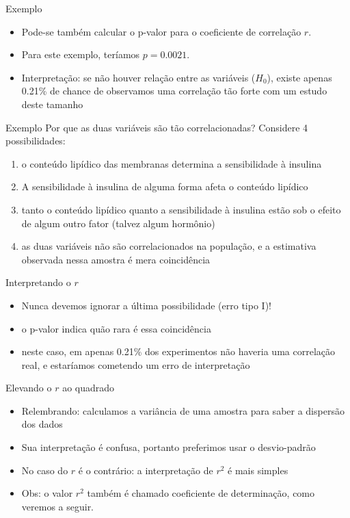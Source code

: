 \documentclass{beamer}
\begin{document}
\begin{frame}{Exemplo}
  \begin{itemize}
  \item Pode-se também calcular o p-valor para o coeficiente de
    correlação $r$.
  \item Para este exemplo, teríamos $p=0.0021$.
  \item Interpretação: se não houver relação entre as variáveis
    ($H_0$), existe apenas 0.21\% de chance de observamos uma
    correlação tão forte com um estudo deste tamanho
  \end{itemize}
\end{frame}

\begin{frame}{Exemplo}
  Por que as duas variáveis são tão correlacionadas? Considere 4
  possibilidades:
  \begin{enumerate}
  \item o conteúdo lipídico das membranas \alert<1>{determina} a
    sensibilidade à insulina
  \item A sensibilidade à insulina de alguma forma afeta o conteúdo lipídico
  \item tanto o conteúdo lipídico quanto a sensibilidade à insulina
    estão sob o efeito de \alert<3>{algum outro} fator (talvez algum hormônio)
  \item as duas variáveis não são correlacionados na população, e a
    estimativa observada nessa amostra é mera coincidência
  \end{enumerate}
\end{frame}

\begin{frame}{Interpretando o $r$}
  \begin{itemize}
  \item Nunca devemos ignorar a última possibilidade (erro tipo I)!
  \item o p-valor indica quão rara é essa coincidência
  \item neste caso, em apenas 0.21\% dos experimentos não haveria uma
    correlação real, e estaríamos cometendo um erro de interpretação
  \end{itemize}
\end{frame}

\begin{frame}{Elevando o $r$ ao quadrado}
  \begin{itemize}
  \item Relembrando: calculamos a variância de uma amostra para saber
    a dispersão dos dados
  \item Sua interpretação é confusa, portanto preferimos usar o
    desvio-padrão
  \item No caso do $r$ é o contrário: a interpretação de $r^2$ é mais simples
  \item Obs: o valor $r^2$ também é chamado \alert{coeficiente de
      determinação}, como veremos a seguir.
  \end{itemize}
\end{frame}
\end{document}
